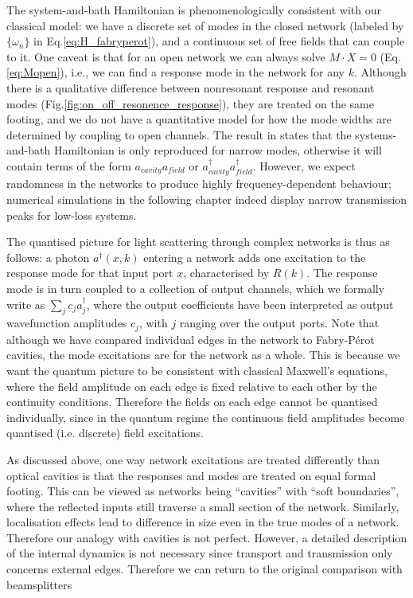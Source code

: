 The system-and-bath Hamiltonian is phenomenologically consistent with our  classical model: we have a discrete set of modes in the closed network (labeled by $\{\omega_n\}$ in Eq.\ref{eq:H_fabryperot}), and a continuous set of free fields that can couple to it. One caveat is that for an open network we can always solve $M\cdot X=0$ (Eq.\ref{eq:Mopen}), i.e., we can find a response mode in the network for any $k$. Although there is a qualitative difference between nonresonant response and resonant modes (Fig.\ref{fig:on_off_resonence_response}), they are treated on the same footing, and we do not have a quantitative model for how the mode widths are determined by coupling to open channels. The result in \cite{Viviescas2003} states that the systems-and-bath Hamiltonian is only reproduced for narrow modes, otherwise it will contain terms of the form $a_{cavity}a_{field}$ or $a_{cavity}^\dagger a_{field}^\dagger$. However, we expect randomness in the networks to produce highly frequency-dependent behaviour; numerical simulations in the following chapter indeed display narrow transmission peaks for low-loss systems. 

The quantised picture for light scattering through complex networks is thus as follows: a photon $a^\dagger(x,k)$ entering a network adds one excitation to the response mode for that input port $x$, characterised by $R(k)$. The response mode is in turn coupled to a collection of output channels, which we formally write as $\sum_j c_j a_j^\dagger$, where the output coefficients have been interpreted as output wavefunction amplitudes $c_j$, with $j$ ranging over the output ports. Note that although we have compared individual edges in the network to Fabry-P\'erot cavities, the mode excitations are for the network as a whole. This is because we want the quantum picture to be consistent with classical Maxwell's equations, where the field amplitude on each edge is fixed relative to each other by the continuity conditions. Therefore the fields on each edge cannot be quantised individually, since in the quantum regime the continuous field amplitudes become quantised (i.e. discrete) field excitations. 

As discussed above, one way network excitations are treated differently than optical cavities is that the responses and modes are treated on equal formal footing. This can be viewed as networks being ``cavities'' with ``soft boundaries'', where the reflected inputs still traverse a small section of the network. Similarly, localisation effects lead to difference in size even in the true modes of a network. Therefore our analogy with cavities is not perfect. However, a detailed description of the internal dynamics is not necessary since transport and transmission only concerns external edges. Therefore we can return to the original comparison with beamsplitters 